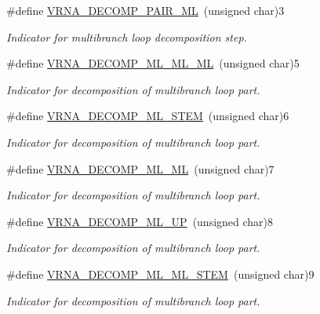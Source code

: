 \begin{DoxyCompactItemize}
\#define \mbox{\hyperlink{group__constraints_gaa15b1185673f0b9e900c4748d45f388f}{V\+R\+N\+A\+\_\+\+D\+E\+C\+O\+M\+P\+\_\+\+P\+A\+I\+R\+\_\+\+ML}}~(unsigned char)3
\begin{DoxyCompactList}\small\item\em Indicator for multibranch loop decomposition step. \end{DoxyCompactList}\item 
\#define \mbox{\hyperlink{group__constraints_ga735517266f2e35e1374b8f1ea77ef23e}{V\+R\+N\+A\+\_\+\+D\+E\+C\+O\+M\+P\+\_\+\+M\+L\+\_\+\+M\+L\+\_\+\+ML}}~(unsigned char)5
\begin{DoxyCompactList}\small\item\em Indicator for decomposition of multibranch loop part. \end{DoxyCompactList}\item 
\#define \mbox{\hyperlink{group__constraints_ga4a23054c75d8efc785de50e3ea87602f}{V\+R\+N\+A\+\_\+\+D\+E\+C\+O\+M\+P\+\_\+\+M\+L\+\_\+\+S\+T\+EM}}~(unsigned char)6
\begin{DoxyCompactList}\small\item\em Indicator for decomposition of multibranch loop part. \end{DoxyCompactList}\item 
\#define \mbox{\hyperlink{group__constraints_ga7f4cb9ff7a33e67f0539bd39e7b19a78}{V\+R\+N\+A\+\_\+\+D\+E\+C\+O\+M\+P\+\_\+\+M\+L\+\_\+\+ML}}~(unsigned char)7
\begin{DoxyCompactList}\small\item\em Indicator for decomposition of multibranch loop part. \end{DoxyCompactList}\item 
\#define \mbox{\hyperlink{group__constraints_gae6478dda14e50e2f2cb9ef333a29256e}{V\+R\+N\+A\+\_\+\+D\+E\+C\+O\+M\+P\+\_\+\+M\+L\+\_\+\+UP}}~(unsigned char)8
\begin{DoxyCompactList}\small\item\em Indicator for decomposition of multibranch loop part. \end{DoxyCompactList}\item 
\#define \mbox{\hyperlink{group__constraints_ga63d8ceb8c96ae3b463e529e28cc0fe98}{V\+R\+N\+A\+\_\+\+D\+E\+C\+O\+M\+P\+\_\+\+M\+L\+\_\+\+M\+L\+\_\+\+S\+T\+EM}}~(unsigned char)9
\begin{DoxyCompactList}\small\item\em Indicator for decomposition of multibranch loop part. \end{DoxyCompactList}\item 

\end{DoxyCompactItemize}
